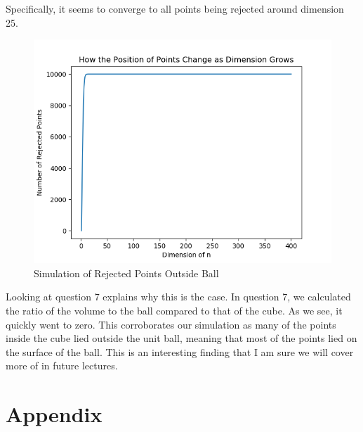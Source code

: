 \documentclass[11pt]{article}
\begin{document}
\begin{enumerate}
	Specifically, it seems to converge to all points being rejected around dimension 25.
	\begin{figure}[H]
		\centering
		\includegraphics[width = 0.6 \linewidth]{SampledPointsSphere.png}
		\caption{Simulation of Rejected Points Outside Ball}
		\label{fig:RejectPoints}
	\end{figure}
	Looking at question 7 explains why this is the case. In question 7, we calculated the ratio of the volume to the ball compared to that of the cube. 
	As we see, it quickly went to zero. This corroborates our simulation as many of the points inside the cube lied outside the unit ball, meaning that most of the points lied on the surface of the ball.
	This is an interesting finding that I am sure we will cover more of in future lectures.
\end{enumerate}
\begin{center}
\end{center}
\section*{Appendix}


\end{document}
